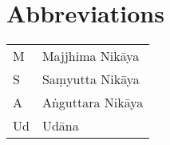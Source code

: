 \chapter*{Abbreviations}

\begin{tabular}{l l}
M & Majjhima Nikāya\\
S & Saṃyutta Nikāya\\
A & Aṅguttara Nikāya\\
Ud & Udāna\\
\end{tabular}
